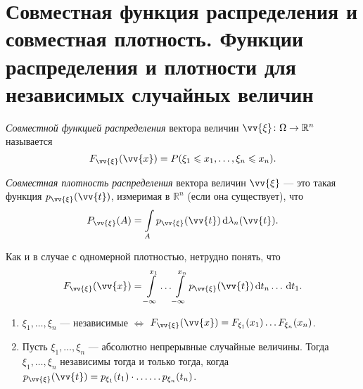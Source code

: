 \section{Совместная функция распределения и совместная плотность. Функции распределения и плотности для независимых случайных величин}


\begin{definition} \textit{Совместной функцией распределения} вектора величин $\vv{\xi} \colon \Omega \rightarrow \mathbb{R}^n$ называется
    $$F_{\vv{\xi}}(\vv{x}) = P(\xi_1 \le x_1, \ldots, \xi_n \le x_n).$$
\end{definition}

\begin{definition}\textit{Совместная плотность распределения} вектора величин $\vv{\xi}$ --- это такая функция $p_{\vv{\xi}}(\vv{t})$, измеримая в $\mathbb{R}^n$ (если она существует), что
    $$P_{\vv{\xi}}(A) =\int\limits_A p_{\vv{\xi}}(\vv{t})\dd\lambda_n(\vv{t}).$$
\end{definition}

Как и в случае с одномерной плотностью, нетрудно понять, что
    $$F_{\vv{\xi}}(\vv{x}) =
        \int\limits_{-\infty}^{x_1}\ldots\int\limits_{-\infty}^{x_n}p_{\vv{\xi}}(\vv{t})\dd t_n\ldots \dd t_1.$$

\begin{corollary}
    \begin{enumerate}
        \item $\xi_1, \ldots, \xi_n$ --- независимые $\iff$ $F_{\vv{\xi}}(\vv{x}) = F_{\xi_1}(x_1)\ldots F_{\xi_n}(x_n)$.

         

        \item Пусть $\xi_1, \ldots, \xi_n$ --- абсолютно непрерывные случайные величины.
              Тогда $\xi_1, \ldots, \xi_n$ независимы тогда и только тогда, когда $p_{\vv{\xi}}(\vv{t}) = p_{\xi_1}(t_1)\cdot\ldots\ldots p_{\xi_n}(t_n)$.

     
    \end{enumerate}
\end{corollary}

